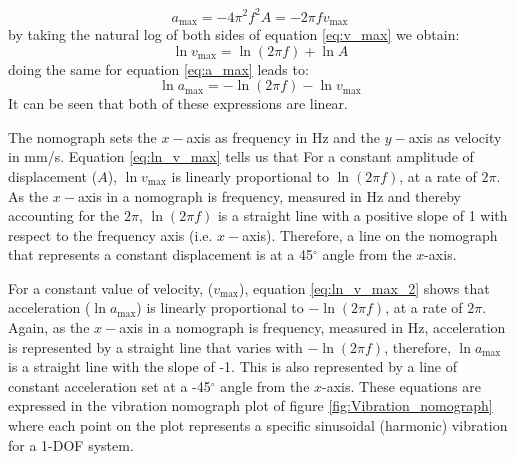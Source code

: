\documentclass[12pt,letter]{article}
\begin{document}
\begin{equation}
    a_\text{max} = -4\pi^2 f^2 A = -2 \pi f v_\text{max}
    \label{eq:a_max}
\end{equation}
by taking the natural log of both sides of equation \ref{eq:v_max} we obtain: 
\begin{equation}
    \ln v_\text{max} = \ln(2\pi f) + \ln A
    \label{eq:ln_v_max} 
\end{equation}
doing the same for equation \ref{eq:a_max} leads to:
\begin{equation}
     \ln a_\text{max} = - \ln(2\pi f) - \ln v_\text{max}
    \label{eq:ln_v_max_2} 
\end{equation}
It can be seen that both of these expressions are linear. 



The nomograph sets the $x-$axis as frequency in Hz and the $y-$axis as velocity in mm/s. Equation \ref{eq:ln_v_max} tells us that For a constant amplitude of displacement ($A$), $\ln v_\text{max}$ is linearly proportional to $\ln (2 \pi f)$, at a rate of $2 \pi$. As the $x-$axis in a nomograph is frequency, measured in Hz and thereby accounting for the $2 \pi$, $\ln (2 \pi f)$ is a straight line with a positive slope of 1 with respect to the frequency axis (i.e. $x-$axis). Therefore, a line on the nomograph that represents a constant displacement is at a 45$^\circ$ angle from the $x$-axis. 


For a constant value of velocity, ($v_\text{max}$), equation \ref{eq:ln_v_max_2} shows that acceleration ($\ln a_\text{max}$) is linearly proportional to $-\ln (2 \pi f)$, at a rate of $2 \pi$. Again, as the $x-$axis in a nomograph is frequency, measured in Hz, acceleration is represented by a straight line that varies with $- \ln(2\pi f)$, therefore, $\ln a_\text{max}$ is a straight line with the slope of -1. This is also represented by a line of constant acceleration set at a -45$^\circ$ angle from the $x$-axis. These equations are expressed in the vibration nomograph plot of figure \ref{fig:Vibration_nomograph} where each point on the plot represents a specific sinusoidal (harmonic) vibration for a 1-DOF system.  
\end{document}

